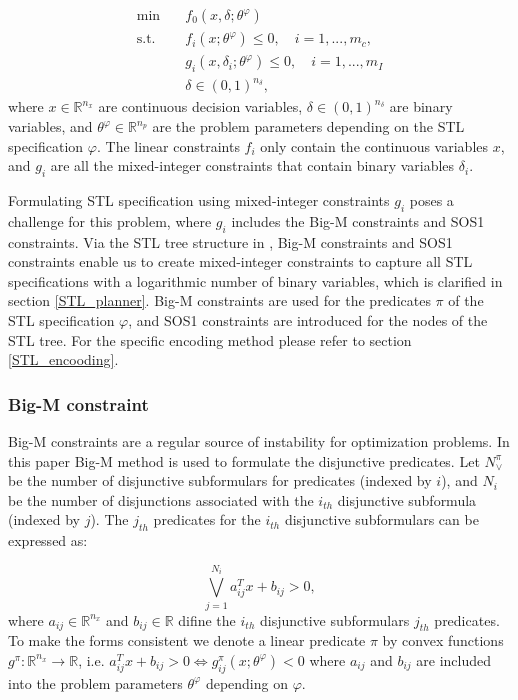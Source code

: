 \documentclass[a4paper]{report}
\begin{document}
\begin{equation}
    \label{eq1}%
    \begin{aligned}
        \min \quad       & f_0(x,\delta;\theta^\varphi )        \\
        \text{s.t.}\quad &
        f_i(x;\theta^\varphi ) \leq 0, \quad i=1,...,m_c,        \\                                         &
        g_i(x,\delta_i ;\theta^\varphi ) \leq 0, \quad i=1,...,m_I
        \\
                         & \delta \in(0,1)^{n_{\delta}},
    \end{aligned}
\end{equation}
where $x \in \mathbb{R} ^{n_{x}}$ are continuous decision variables, $\delta \in(0,1)^{n_{\delta}} $ are binary variables, and $\theta^\varphi \in \mathbb{R} ^{n_{p}}$ are the problem parameters depending on the STL specification $\varphi$. The linear constraints $f_i$ only contain the continuous variables $x$, and $g_i$ are all the mixed-integer constraints that contain binary variables $\delta_i$. 

Formulating STL specification using mixed-integer constraints $g_i$ poses a challenge for this problem, where $g_i$ includes the Big-M constraints and SOS1 constraints. Via the STL tree structure in \cite{kurtz2022mixed}\cite{leung2020back}, Big-M constraints and SOS1 constraints enable us to create mixed-integer constraints to capture all STL specifications with a logarithmic number of binary variables, which is clarified in section \ref*{STL_planner}. Big-M constraints are used for the predicates $\pi$ of the STL specification $\varphi$, and SOS1 constraints are introduced for the nodes of the STL tree. For the specific encoding method please refer to section \ref*{STL_encooding}.


\subsubsection*{Big-M constraint}
Big-M constraints are a regular source of instability for optimization problems. In this paper Big-M method is used to formulate the disjunctive predicates. Let $N_\vee^{\pi}$ be the number of disjunctive subformulars for predicates (indexed by $i$), and $N_i$ be the number of disjunctions associated with the $i_{th}$ disjunctive subformula (indexed by $j$). The $j_{th}$ predicates for the $i_{th}$ disjunctive subformulars can be expressed as:

\begin{equation}
    \bigvee_{j=1}^{N_i} a_{ij}^Tx+b_{ij}>0,
\label{linear_predicates}
\end{equation}
where $a_{ij} \in \mathbb{R} ^{n_{x}} $ and $b_{ij} \in \mathbb{R}$ difine the $i_{th}$ disjunctive subformulars $j_{th} $ predicates.
To make the forms consistent we denote a linear predicate $\pi$ by convex functions $g^\pi
:\mathbb{R}^{n_x} \rightarrow \mathbb{R}$, i.e. $a_{ij}^Tx+b_{ij}>0 \Leftrightarrow  g_{ij}^\pi(x;\theta^\varphi)<0$ where $a_{ij}$ and $b_{ij}$ are included into the problem parameters $\theta^\varphi$ depending on $\varphi$.
 
\end{document}
